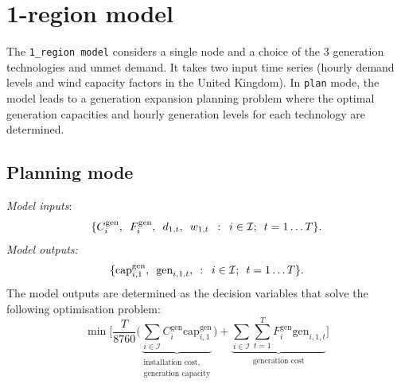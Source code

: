 \documentclass[preprint]{elsarticle}
\begin{document}
\section{1-region model}

\noindent The \texttt{1\_region model} considers a single node and a choice of the 3 generation technologies and unmet demand. It takes two input time series (hourly demand levels and wind capacity factors in the United Kingdom). In \texttt{plan} mode, the model leads to a generation expansion planning problem where the optimal generation capacities and hourly generation levels for each technology are determined. 




\subsection{Planning mode}
\label{sec:appendix:optimisation:model_1}
\noindent \textit{Model inputs}:
\begin{equation}
  \{C_{i}^\text{gen}, \hspace{0.5em} F_{i}^\text{gen}, \hspace{0.5em} d_{1, t}, \hspace{0.5em} w_{1, t} \hspace{0.5em} : \hspace{0.5em} i \in \mathcal{I}; \hspace{0.5em} t = 1 \ldots T\}.
\label{eq:model_1:inputs}
\end{equation}
\textit{Model outputs:}
\begin{equation}
\{\text{cap}_{i,1}^\text{gen}, \hspace{0.5em} \text{gen}_{i,1,t}, \hspace{0.5em} : \hspace{0.5em} i \in \mathcal{I}; \hspace{0.5em} t = 1 \ldots T\}.
\label{eq:model_1:decision_variables}
\end{equation}
The model outputs are determined as the decision variables that solve the following optimisation problem:
\begin{equation}
\min \Bigg[ \frac{T}{8760} \Bigg( \underbrace{\sum_{i \in \mathcal{I}} C_i^\text{gen} \text{cap}_{i,1}^\text{gen}}_{\substack{\text{installation cost,} \\ \text{generation capacity}}} \Bigg) + \underbrace{ \sum_{i \in \mathcal{I}} \sum_{t=1}^{T} F_i^\text{gen} \text{gen}_{i,1,t}}_\text{generation cost} \Bigg]
\label{eq:model_1:objective}
\end{equation}
\end{document}
